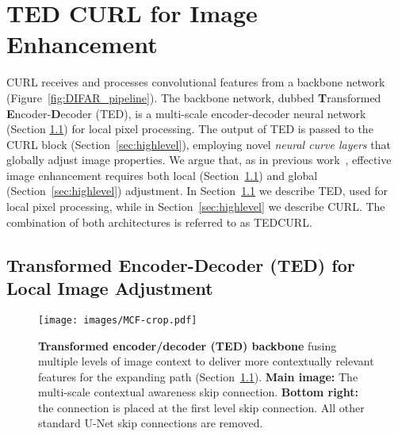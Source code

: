 \documentclass[a4paper,conference]{IEEEtran}
\begin{document}
\section{TED  CURL for Image Enhancement}\label{sec:methods}

CURL receives and processes convolutional features from a backbone network (Figure~\ref{fig:DIFAR_pipeline}). The backbone network, dubbed \textbf{T}ransformed \textbf{E}ncoder-\textbf{D}ecoder (TED), is a multi-scale encoder-decoder neural network (Section \ref{sec:lowlevel}) for local pixel processing. The output of TED is passed to the CURL block  (Section~\ref{sec:highlevel}), employing  novel \emph{neural curve layers} that globally adjust image properties. We argue that, as in previous work~\cite{schwartz19,Chen2018DPE}, effective image enhancement requires both local (Section~\ref{sec:lowlevel}) and global (Section~\ref{sec:highlevel}) adjustment. In Section~\ref{sec:lowlevel} we describe TED,  used for local pixel processing, while in Section~\ref{sec:highlevel} we describe CURL. The combination of both architectures is referred to as TEDCURL.

\subsection{Transformed Encoder-Decoder (TED) for Local Image Adjustment}
\label{sec:lowlevel}

\begin{figure}[t!]
\begin{center}
\texttt{[image: images/MCF-crop.pdf]}
\end{center}
\caption{\textbf{Transformed encoder/decoder (TED) backbone} fusing multiple levels of image context to deliver more contextually relevant features for the expanding path (Section~\ref{sec:lowlevel}). \textbf{Main image:} The multi-scale contextual awareness skip connection. \textbf{Bottom right:} the connection is placed at the first level skip connection. All other standard U-Net skip connections are removed.}
\label{fig:fusion_block}
\end{figure} 
\end{document}
